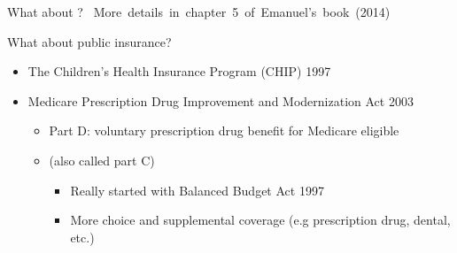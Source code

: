 \begin{frame}{What about ?}
\vspace{10mm}
\hbox{\hspace{-8mm} \color{gray} \footnotesize More details in chapter 5 of Emanuel's book (2014)}
\end{frame}
\begin{frame}{What about public insurance? }

\begin{itemize}
        \item The Children's Health Insurance Program (CHIP) 1997
        \vspace{3mm}

        \item Medicare Prescription Drug Improvement and Modernization Act 2003
        \begin{itemize}
            \item Part D: voluntary prescription drug benefit for Medicare eligible
            \item {} (also called part C)
            \begin{itemize}
                \item Really started with Balanced Budget Act 1997
                \item More choice and supplemental coverage (e.g prescription drug, dental, etc.)
            \end{itemize}
        \end{itemize}

    \end{itemize}

\end{frame}

